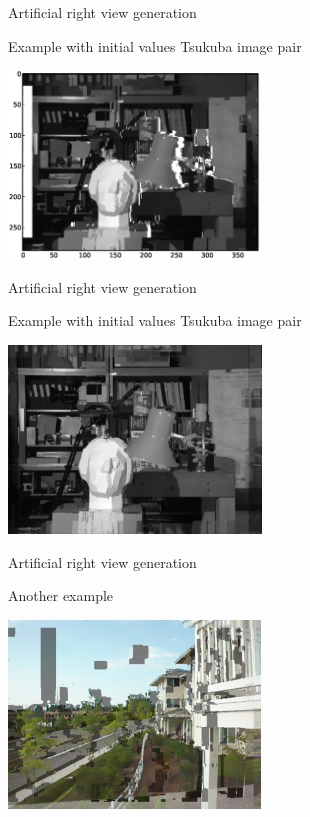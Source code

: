\documentclass[12pt]{beamer}
\begin{document}
\begin{frame}{Artificial right view generation}
  \begin{block}{Example with initial values}
    Tsukuba image pair
  \end{block}
  \begin{center}
    \includegraphics[height=5cm]{graphics/warpmat-virtual-full.eps}
  \end{center}
\end{frame}

\begin{frame}{Artificial right view generation}
  \begin{block}{Example with initial values}
    Tsukuba image pair
  \end{block}
  \begin{center}
    \includegraphics[height=5cm]{graphics/warpmat-virtual-overlay.png}
  \end{center}
\end{frame}

\begin{frame}{Artificial right view generation}
  \begin{block}{}
    Another example
  \end{block}
  \begin{center}
    \includegraphics[height=5cm]{graphics/warpmat-another-example.png}
  \end{center}
\end{frame}
\end{document}
